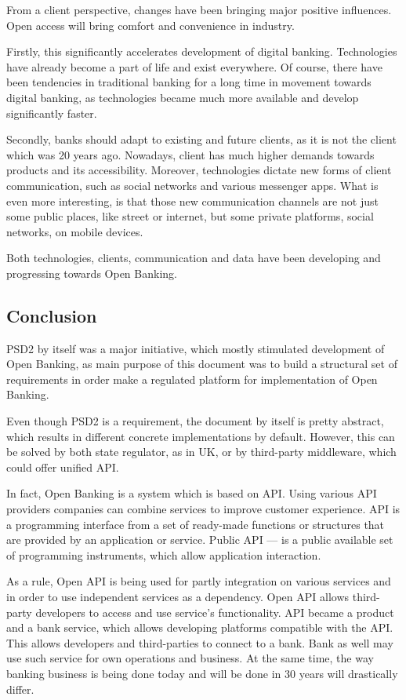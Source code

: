 From a client perspective, changes have been bringing major positive influences.
Open access will bring comfort and convenience in industry.

Firstly, this significantly accelerates development of digital banking.
Technologies have already become a part of life and exist everywhere.
Of course, there have been tendencies in traditional banking for a long time in movement towards digital banking, as technologies became much more available and develop significantly faster.

Secondly, banks should adapt to existing and future clients, as it is not the client which was 20 years ago.
Nowadays, client has much higher demands towards products and its accessibility.
Moreover, technologies dictate new forms of client communication, such as social networks and various messenger apps.
What is even more interesting, is that those new communication channels are not just some public places, like street or internet, but some private platforms, social networks, on mobile devices.

Both technologies, clients, communication and data have been developing and progressing towards Open Banking.




\subsection{Conclusion}

PSD2 by itself was a major initiative, which mostly stimulated development of Open Banking, as main purpose of this document was to build a structural set of requirements in order make a regulated platform for implementation of Open Banking.

Even though PSD2 is a requirement, the document by itself is pretty abstract, which results in different concrete implementations by default.
However, this can be solved by both state regulator, as in UK, or by third-party middleware, which could offer unified API.

In fact, Open Banking is a system which is based on API.
Using various API providers companies can combine services to improve customer experience.
API is a programming interface from a set of ready-made functions or structures that are provided by an application or service.
Public API — is a public available set of programming instruments, which allow application interaction.

As a rule, Open API is being used for partly integration on various services and in order to use independent services as a dependency.
Open API allows third-party developers to access and use service's functionality.
API became a product and a bank service, which allows developing platforms compatible with the API.
This allows developers and third-parties to connect to a bank. 
Bank as well may use such service for own operations and business.
At the same time, the way banking business is being done today and will be done in 30 years will drastically differ.

